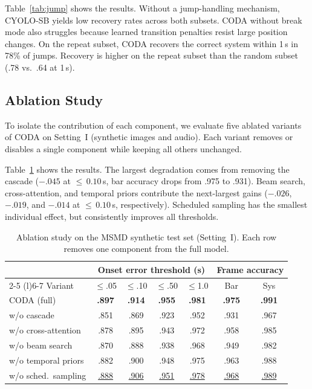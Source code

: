 \documentclass{article}
\newcommand{\first}[1]{\textcolor{best}{\textbf{#1}}}
\newcommand{\second}[1]{\textcolor{second}{\underline{#1}}}
\begin{document}
Table~\ref{tab:jump} shows the results. Without a jump-handling mechanism, CYOLO-SB yields low recovery rates across both subsets. CODA without break mode also struggles because learned transition penalties resist large position changes. On the repeat subset, CODA recovers the correct system within 1\,s in 78\% of jumps. Recovery is higher on the repeat subset than the random subset (.78 vs.\ .64 at 1\,s).

\subsection{Ablation Study}\label{sec:ablation}

To isolate the contribution of each component, we evaluate five ablated variants of CODA on Setting~I (synthetic images and audio). Each variant removes or disables a single component while keeping all others unchanged.

Table~\ref{tab:ablation} shows the results. The largest degradation comes from removing the cascade ($-.045$ at ${\leq}\,0.10$\,s, bar accuracy drops from .975 to .931). Beam search, cross-attention, and temporal priors contribute the next-largest gains ($-.026$, $-.019$, and $-.014$ at ${\leq}\,0.10$\,s, respectively). Scheduled sampling has the smallest individual effect, but consistently improves all thresholds.

\begin{table}[h]
\centering
\caption{Ablation study on the MSMD synthetic test set (Setting~I). Each row
removes one component from the full model.}
\label{tab:ablation}
\scriptsize
\setlength{\tabcolsep}{2.5pt}
\begin{tabular}{@{}l cccc cc@{}}
\toprule
& \multicolumn{4}{c}{Onset error threshold (s)} & \multicolumn{2}{c}{Frame accuracy} \\
\cmidrule(lr){2-5} \cmidrule(l){6-7}
Variant & ${\leq}$.05 & ${\leq}$.10 & ${\leq}$.50 & ${\leq}$1.0 & Bar & Sys \\
\midrule
\rowcolor{rowhl}
CODA (full)            & \first{.897} & \first{.914} & \first{.955} & \first{.981} & \first{.975} & \first{.991} \\
\midrule
w/o cascade            & .851 & .869 & .923 & .952 & .931 & .967 \\
w/o cross-attention    & .878 & .895 & .943 & .972 & .958 & .985 \\
w/o beam search        & .870 & .888 & .938 & .968 & .949 & .982 \\
w/o temporal priors    & .882 & .900 & .948 & .975 & .963 & .988 \\
w/o sched.\ sampling   & \second{.888} & \second{.906} & \second{.951} & \second{.978} & \second{.968} & \second{.989} \\
\bottomrule
\end{tabular}
\end{table}
\end{document}
